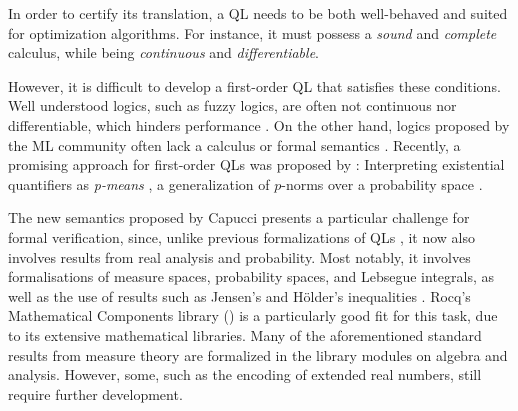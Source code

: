 \documentclass[sigplan, screen, review, nonacm]{acmart}
\begin{document}
In order to certify its translation, a QL needs to be both well-behaved and suited for optimization algorithms. For instance, it must possess a  \textit{sound} and \textit{complete} calculus, while being \textit{continuous} and \textit{differentiable}. 
\begin{comment}   
\begin{itemize}
    \item \textit{Compositionality}: Negation should compose with conjunction and disjunction, while conjunction and disjunction should satisfy the usual properties of idempotence, commutativity, and associativity.
    \item \textit{Quantifier Aggregation}: Quantifiers should be monotonic, continuous, and satisfy boundary conditions.
    \item \textit{Shadow-lifting}: A function should improve if any of its parameters improves.
    \item \textit{Non-vanishing gradients}: A function's gradient should not approximate zero at a sub-interval of the domain.
\end{itemize}
\end{comment}
However, it is difficult to develop a first-order QL that satisfies these conditions. Well understood logics, such as fuzzy logics, are often not continuous nor differentiable, which hinders performance \citep{van2022analyzing}. On the other hand, logics proposed by the ML community often lack a calculus or formal semantics \citep{van2022analyzing, affeldt2024taming}. Recently, a promising approach for first-order QLs was proposed by \citeauthor{capucci2024quantifiers}: 
Interpreting existential quantifiers as \textit{p-means} \citep{capucci2024quantifiers}, a generalization of $p$-norms over a probability space \cite{lpspaces}.  

The new semantics proposed by Capucci presents a particular challenge for formal verification, since, unlike previous formalizations of QLs \cite{affeldt2024taming}, it now also involves results from real analysis and probability. Most notably, it involves formalisations of measure spaces, probability spaces, and Lebsegue integrals, as well as the use of results such as Jensen's  and Hölder's inequalities \cite{mitrinovic1970analytic}. Rocq's Mathematical Components library (\mathcomp{}) \cite{mathcomp} is a particularly good fit for this task, due to its extensive mathematical libraries. Many of the aforementioned standard results from measure theory are formalized in the library modules on algebra and analysis. However, some, such as the encoding of extended real numbers, still require further development. 
\end{document}
